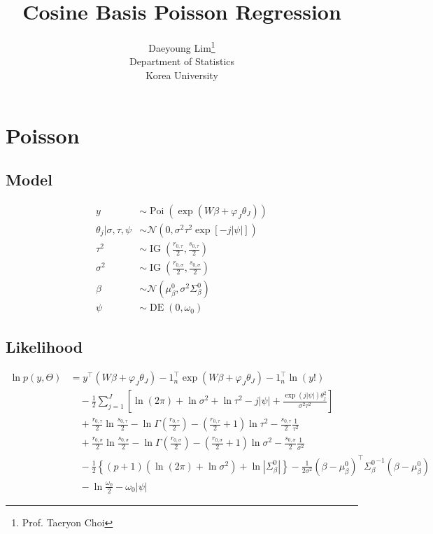\documentclass[11pt]{article}
\newcommand{\opn}{\operatorname}
\begin{document}
\nocite{*}

\title{Cosine Basis Poisson Regression}

\author{Daeyoung Lim\thanks{Prof. Taeryon Choi} \\
Department of Statistics \\
Korea University}

\maketitle
\section{Poisson}
\subsection{Model}
  \begin{align*}
    y &\sim \opn{Poi}\left(\exp\left(W\beta + \varphi_{J}\theta_{J}\right)\right)\\
    \theta_{j}|\sigma, \tau,\psi &\sim \mathcal{N}\left(0,\sigma^{2}\tau^{2}\exp\left[-j\left|\psi\right|\right]\right)\\
    \tau^{2} &\sim \opn{IG}\left(\frac{r_{0,\tau}}{2}, \frac{s_{0,\tau}}{2}\right)\\
    \sigma^{2} &\sim \opn{IG}\left(\frac{r_{0,\sigma}}{2}, \frac{s_{0,\sigma}}{2}\right)\\
    \beta &\sim \mathcal{N}\left(\mu_{\beta}^{0}, \sigma^{2}\Sigma_{\beta}^{0}\right)\\
    \psi &\sim \opn{DE}\left(0,\omega_{0}\right)
  \end{align*}
\subsection{Likelihood}
  \begin{align*}
    \ln p\left(y, \Theta\right) &= y^{\top}\left(W\beta + \varphi_{J}\theta_{J}\right) - 1_{n}^{\top}\exp\left(W\beta+\varphi_{J}\theta_{J}\right) -1_{n}^{\top}\ln\left(y!\right)\\
    &\quad -\frac{1}{2}\sum_{j=1}^{J}\left[\ln\left(2\pi\right)+\ln\sigma^{2}+\ln\tau^{2}-j\left|\psi\right|+\frac{\exp\left(j\left|\psi\right|\right)\theta_{j}^{2}}{\sigma^{2}\tau^{2}}\right]\\
    &\quad +\frac{r_{0,\tau}}{2}\ln\frac{s_{0,\tau}}{2} -\ln\Gamma\left(\frac{r_{0,\tau}}{2}\right)-\left(\frac{r_{0,\tau}}{2}+1\right)\ln \tau^{2} -\frac{s_{0,\tau}}{2}\frac{1}{\tau^{2}}\\
    &\quad +\frac{r_{0,\sigma}}{2}\ln\frac{s_{0,\sigma}}{2} -\ln\Gamma\left(\frac{r_{0,\sigma}}{2}\right)-\left(\frac{r_{0,\sigma}}{2}+1\right)\ln \sigma^{2} -\frac{s_{0,\sigma}}{2}\frac{1}{\sigma^{2}}\\
    &\quad -\frac{1}{2}\left\{\left(p+1\right)\left(\ln\left(2\pi\right)+\ln\sigma^{2}\right) + \ln\left|\Sigma_{\beta}^{0}\right| \right\} -\frac{1}{2\sigma^{2}}\left(\beta-\mu_{\beta}^{0}\right)^{\top}{\Sigma_{\beta}^{0}}^{-1}\left(\beta-\mu_{\beta}^{0}\right)\\
    &\quad -\ln\frac{\omega_{0}}{2} -\omega_{0}\left|\psi\right|
  \end{align*}
\end{document}
